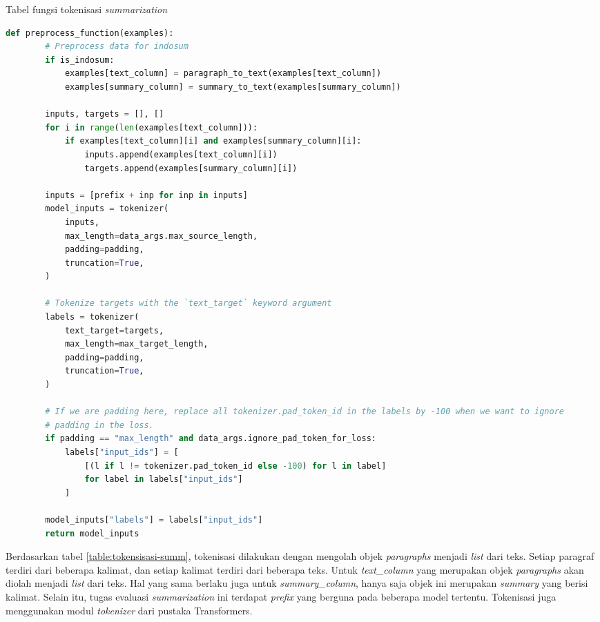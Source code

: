 \begin{table}
    \caption{Tabel fungsi tokenisasi \textit{summarization}}
    \label{table:tokensisasi-summ}
    \begin{lstlisting}[language=python]
    def preprocess_function(examples):
        # Preprocess data for indosum
        if is_indosum:
            examples[text_column] = paragraph_to_text(examples[text_column])
            examples[summary_column] = summary_to_text(examples[summary_column])

        inputs, targets = [], []
        for i in range(len(examples[text_column])):
            if examples[text_column][i] and examples[summary_column][i]:
                inputs.append(examples[text_column][i])
                targets.append(examples[summary_column][i])

        inputs = [prefix + inp for inp in inputs]
        model_inputs = tokenizer(
            inputs,
            max_length=data_args.max_source_length,
            padding=padding,
            truncation=True,
        )

        # Tokenize targets with the `text_target` keyword argument
        labels = tokenizer(
            text_target=targets,
            max_length=max_target_length,
            padding=padding,
            truncation=True,
        )

        # If we are padding here, replace all tokenizer.pad_token_id in the labels by -100 when we want to ignore
        # padding in the loss.
        if padding == "max_length" and data_args.ignore_pad_token_for_loss:
            labels["input_ids"] = [
                [(l if l != tokenizer.pad_token_id else -100) for l in label]
                for label in labels["input_ids"]
            ]

        model_inputs["labels"] = labels["input_ids"]
        return model_inputs
    \end{lstlisting}
\end{table}

Berdasarkan tabel \ref{table:tokensisasi-summ}, tokenisasi dilakukan dengan mengolah objek \textit{paragraphs} menjadi \textit{list} dari teks. Setiap paragraf terdiri dari beberapa kalimat, dan setiap kalimat terdiri dari beberapa teks. Untuk \textit{text\_column} yang merupakan objek \textit{paragraphs} akan diolah menjadi \textit{list} dari teks. Hal yang sama berlaku juga untuk \textit{summary\_column}, hanya saja objek ini merupakan \textit{summary} yang berisi kalimat. Selain itu, tugas evaluasi \textit{summarization} ini terdapat \textit{prefix} yang berguna pada beberapa model tertentu. Tokenisasi juga menggunakan modul \textit{tokenizer} dari pustaka Transformers.

